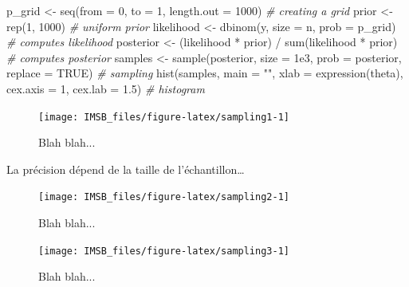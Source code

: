 \documentclass[
  a4paper,11pt,twoside,onecolumn,openright,final,oldfontcommands]{memoir}
\newenvironment{Shaded}{\begin{snugshade}}{\end{snugshade}}
\newcommand{\AttributeTok}[1]{\textcolor[rgb]{0.77,0.63,0.00}{#1}}
\newcommand{\CommentTok}[1]{\textcolor[rgb]{0.56,0.35,0.01}{\textit{#1}}}
\newcommand{\ConstantTok}[1]{\textcolor[rgb]{0.00,0.00,0.00}{#1}}
\newcommand{\DecValTok}[1]{\textcolor[rgb]{0.00,0.00,0.81}{#1}}
\newcommand{\FloatTok}[1]{\textcolor[rgb]{0.00,0.00,0.81}{#1}}
\newcommand{\FunctionTok}[1]{\textcolor[rgb]{0.00,0.00,0.00}{#1}}
\newcommand{\NormalTok}[1]{#1}
\newcommand{\OtherTok}[1]{\textcolor[rgb]{0.56,0.35,0.01}{#1}}
\newcommand{\SpecialCharTok}[1]{\textcolor[rgb]{0.00,0.00,0.00}{#1}}
\newcommand{\StringTok}[1]{\textcolor[rgb]{0.31,0.60,0.02}{#1}}
\theoremstyle{definition}
\theoremstyle{definition}
\theoremstyle{definition}
\theoremstyle{definition}
\theoremstyle{remark}
\begin{document}
\begin{Shaded}
\begin{Highlighting}[]
\NormalTok{p\_grid }\OtherTok{\textless{}{-}} \FunctionTok{seq}\NormalTok{(}\AttributeTok{from =} \DecValTok{0}\NormalTok{, }\AttributeTok{to =} \DecValTok{1}\NormalTok{, }\AttributeTok{length.out =} \DecValTok{1000}\NormalTok{) }\CommentTok{\# creating a grid}
\NormalTok{prior }\OtherTok{\textless{}{-}} \FunctionTok{rep}\NormalTok{(}\DecValTok{1}\NormalTok{, }\DecValTok{1000}\NormalTok{) }\CommentTok{\# uniform prior}
\NormalTok{likelihood }\OtherTok{\textless{}{-}} \FunctionTok{dbinom}\NormalTok{(y, }\AttributeTok{size =}\NormalTok{ n, }\AttributeTok{prob =}\NormalTok{ p\_grid) }\CommentTok{\# computes likelihood}
\NormalTok{posterior }\OtherTok{\textless{}{-}}\NormalTok{ (likelihood }\SpecialCharTok{*}\NormalTok{ prior) }\SpecialCharTok{/} \FunctionTok{sum}\NormalTok{(likelihood }\SpecialCharTok{*}\NormalTok{ prior) }\CommentTok{\# computes posterior}
\NormalTok{samples }\OtherTok{\textless{}{-}} \FunctionTok{sample}\NormalTok{(posterior, }\AttributeTok{size =} \FloatTok{1e3}\NormalTok{, }\AttributeTok{prob =}\NormalTok{ posterior, }\AttributeTok{replace =} \ConstantTok{TRUE}\NormalTok{) }\CommentTok{\# sampling}
\FunctionTok{hist}\NormalTok{(samples, }\AttributeTok{main =} \StringTok{""}\NormalTok{, }\AttributeTok{xlab =} \FunctionTok{expression}\NormalTok{(theta), }\AttributeTok{cex.axis =} \DecValTok{1}\NormalTok{, }\AttributeTok{cex.lab =} \FloatTok{1.5}\NormalTok{) }\CommentTok{\# histogram}
\end{Highlighting}
\end{Shaded}

\begin{figure}[!htb]

{\centering \texttt{[image: IMSB\_files/figure-latex/sampling1-1]} 

}

\caption{Blah blah...}\label{fig:sampling1}
\end{figure}

La précision dépend de la taille de l'échantillon\ldots{}

\begin{figure}[!htb]

{\centering \texttt{[image: IMSB\_files/figure-latex/sampling2-1]} 

}

\caption{Blah blah...}\label{fig:sampling2}
\end{figure}

\begin{figure}[!htb]

{\centering \texttt{[image: IMSB\_files/figure-latex/sampling3-1]} 

}

\caption{Blah blah...}\label{fig:sampling3}
\end{figure}
\end{document}
